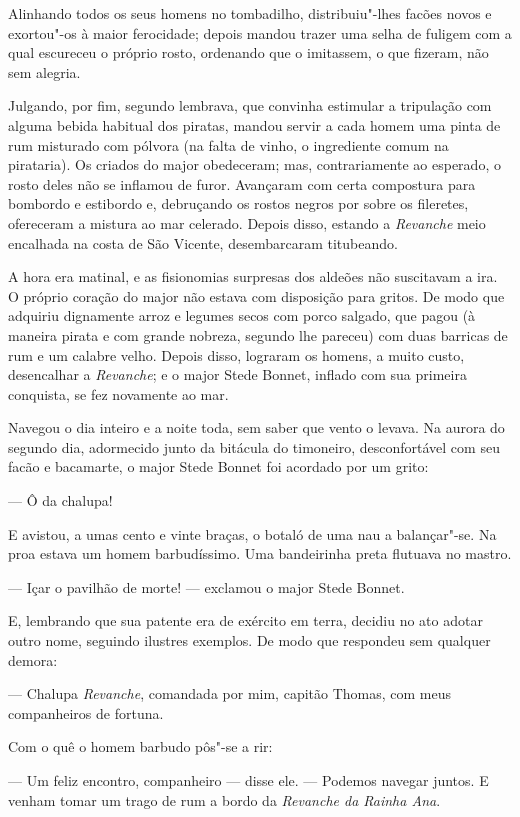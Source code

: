 Alinhando todos os seus homens no tombadilho, distribuiu"-lhes facões novos
e exortou"-os à maior ferocidade; depois mandou trazer uma selha de fuligem
com a qual escureceu o próprio rosto, ordenando que o imitassem, o que
fizeram, não sem alegria.

Julgando, por fim, segundo lembrava, que convinha estimular a tripulação
com alguma bebida habitual dos piratas, mandou servir a cada homem uma
pinta de rum misturado com pólvora (na falta de vinho, o ingrediente comum
na pirataria). Os criados do major obedeceram; mas, contrariamente ao
esperado, o rosto deles não se inflamou de furor. Avançaram com certa
compostura para bombordo e estibordo e, debruçando os rostos negros por
sobre os fileretes, ofereceram a mistura ao mar celerado. Depois disso,
estando a \textit{Revanche} meio encalhada na costa de São Vicente,
desembarcaram titubeando.

A hora era matinal, e as fisionomias surpresas dos aldeões não suscitavam a
ira. O próprio coração do major não estava com disposição para gritos. De
modo que adquiriu dignamente arroz e legumes secos com porco salgado, que
pagou (à maneira pirata e com grande nobreza, segundo lhe pareceu) com
duas barricas de rum e um calabre velho. Depois disso, lograram os homens,
a muito custo, desencalhar a \textit{Revanche}; e o major Stede Bonnet,
inflado com sua primeira conquista, se fez novamente ao mar.

Navegou o dia inteiro e a noite toda, sem saber que vento o levava. Na
aurora do segundo dia, adormecido junto da bitácula do timoneiro,
desconfortável com seu facão e bacamarte, o major Stede Bonnet foi
acordado por um grito:

--- Ô da chalupa!

E avistou, a umas cento e vinte braças, o botaló de uma nau a
balançar"-se. Na proa estava um homem barbudíssimo. Uma bandeirinha preta
flutuava no mastro.

--- Içar o pavilhão de morte! --- exclamou o major Stede Bonnet.

E, lembrando que sua patente era de exército em terra, decidiu no ato
adotar outro nome, seguindo ilustres exemplos. De modo que respondeu sem
qualquer demora:

--- Chalupa \textit{Revanche}, comandada por mim, capitão Thomas, com meus
companheiros de fortuna.

Com o quê o homem barbudo pôs"-se a rir:

--- Um feliz encontro, companheiro --- disse ele. --- Podemos navegar juntos. E
venham tomar um trago de rum a bordo da \textit{Revanche da Rainha Ana}.

